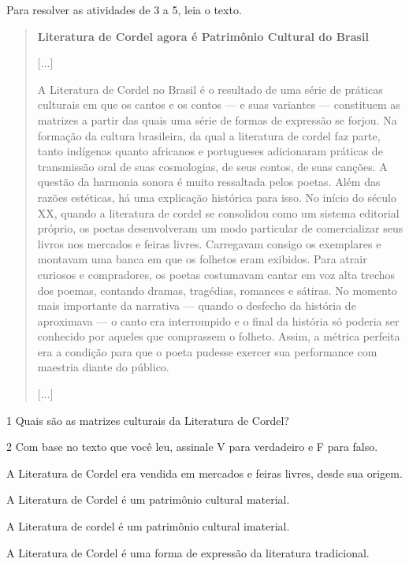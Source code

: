 \pagebreak
{}

Para resolver as atividades de 3 a 5, leia o texto.

\begin{quote}
\textbf{Literatura de Cordel agora é Patrimônio Cultural do Brasil}

{[}...{]}

A Literatura de Cordel no Brasil é o resultado de uma série de
práticas culturais em que os cantos e os contos --- e suas variantes ---
constituem as matrizes a partir das quais uma série de formas de
expressão se forjou. Na formação da cultura brasileira, da qual a
literatura de cordel faz parte, tanto indígenas quanto africanos e
portugueses adicionaram práticas de transmissão oral de suas
cosmologias, de seus contos, de suas canções. A questão da harmonia
sonora é muito ressaltada pelos poetas. Além das razões estéticas, há
uma explicação histórica para isso. No início do século XX, quando a
literatura de cordel se consolidou como um sistema editorial próprio, os
poetas desenvolveram um modo particular de comercializar seus livros nos
mercados e feiras livres. Carregavam consigo os exemplares e montavam
uma banca em que os folhetos eram exibidos. Para atrair curiosos e
compradores, os poetas costumavam cantar em voz alta trechos dos poemas,
contando dramas, tragédias, romances e sátiras. No momento mais
importante da narrativa --- quando o desfecho da história de aproximava
--- o canto era interrompido e o final da história só poderia ser
conhecido por aqueles que comprassem o folheto. Assim, a métrica
perfeita era a condição para que o poeta pudesse exercer sua performance
com maestria diante do público.

{[}...{]}

\end{quote}

\num{1}  Quais são as matrizes culturais da Literatura de Cordel?


\num{2}  Com base no texto que você leu, assinale V para verdadeiro e F para falso.

\begin{boxlist}
 A Literatura de Cordel era vendida em mercados e feiras livres, desde sua origem.

 A Literatura de Cordel é um patrimônio cultural material.

 A Literatura de cordel é um patrimônio cultural imaterial.

 A Literatura de Cordel é uma forma de expressão da literatura tradicional.
\end{boxlist}

